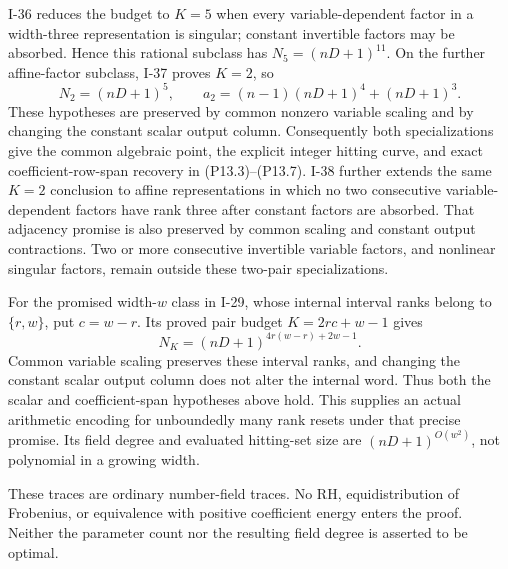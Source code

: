 I-36 reduces the budget to $K=5$ when every variable-dependent
factor in a width-three representation is singular; constant
invertible factors may be absorbed. Hence this rational subclass
has $N_5=(nD+1)^{11}$. On the further affine-factor subclass,
I-37 proves $K=2$, so
\[
 N_2=(nD+1)^5,\qquad
 a_2=(n-1)(nD+1)^4+(nD+1)^3.
\]
These hypotheses are preserved by common nonzero variable scaling
and by changing the constant scalar output column. Consequently
both specializations give the common algebraic point, the explicit
integer hitting curve, and exact coefficient-row-span recovery in
(P13.3)--(P13.7). I-38 further extends the same $K=2$ conclusion to affine
representations in which no two consecutive variable-dependent
factors have rank three after constant factors are absorbed.
That adjacency promise is also preserved by common scaling and
constant output contractions. Two or more consecutive invertible
variable factors, and nonlinear singular factors, remain outside
these two-pair specializations.

For the promised width-$w$ class in I-29, whose internal interval
ranks belong to $\{r,w\}$, put $c=w-r$. Its proved pair budget
$K=2rc+w-1$ gives
\[
 N_K=(nD+1)^{4r(w-r)+2w-1}.
\]
Common variable scaling preserves these interval ranks, and
changing the constant scalar output column does not alter the
internal word. Thus both the scalar and coefficient-span
hypotheses above hold. This supplies an actual arithmetic
encoding for unboundedly many rank resets under that precise
promise. Its field degree and evaluated hitting-set size are
$(nD+1)^{O(w^2)}$, not polynomial in a growing width.

These traces are ordinary number-field traces. No RH,
equidistribution of Frobenius, or equivalence with positive coefficient
energy enters the proof. Neither the parameter count nor
the resulting field degree is asserted to be optimal.
